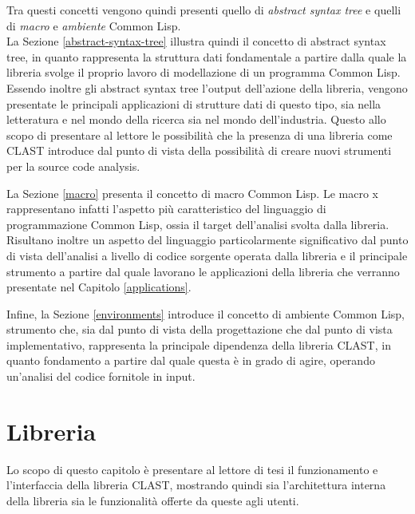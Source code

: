 \documentclass{book}
\begin{document}
Tra questi concetti vengono quindi presenti quello di
\textit{abstract syntax tree} e quelli di \textit{macro} e \textit{ambiente}
Common Lisp.\\

La Sezione \ref{abstract-syntax-tree} illustra quindi il concetto di abstract
syntax tree, in quanto rappresenta la struttura dati fondamentale a partire
dalla quale la libreria svolge il proprio lavoro di modellazione di un programma
Common Lisp. Essendo inoltre gli abstract syntax tree l'output dell'azione della
libreria, vengono presentate le principali applicazioni di strutture dati di
questo tipo, sia nella letteratura e nel mondo della ricerca sia nel mondo
dell'industria. Questo allo scopo di presentare al lettore le possibilità che la
presenza di una libreria come CLAST introduce dal punto di vista della
possibilità di creare nuovi strumenti per la source code analysis.

La Sezione \ref{macro} presenta il concetto di macro Common Lisp. Le macro x
rappresentano infatti l'aspetto più caratteristico del linguaggio di
programmazione Common Lisp, ossia il target dell'analisi svolta dalla libreria.
Risultano inoltre un aspetto del linguaggio particolarmente significativo dal
punto di vista dell'analisi a livello di codice sorgente operata dalla libreria
e il principale strumento a partire dal quale lavorano le applicazioni della
libreria che verranno presentate nel Capitolo \ref{applications}.

Infine, la Sezione \ref{environments} introduce il concetto di ambiente Common
Lisp, strumento che, sia dal punto di vista della progettazione che dal punto di
vista implementativo, rappresenta la principale dipendenza della libreria CLAST,
in quanto fondamento a partire dal quale questa è in grado di agire, operando
un'analisi del codice fornitole in input.






\endgroup

\begingroup
\let\clearpage\relax

\chapter{Libreria}
\label{library}

Lo scopo di questo capitolo è presentare al lettore di tesi il funzionamento e
l'interfaccia della libreria CLAST, mostrando quindi sia l'architettura interna
della libreria sia le funzionalità offerte da queste agli utenti.
\end{document}
